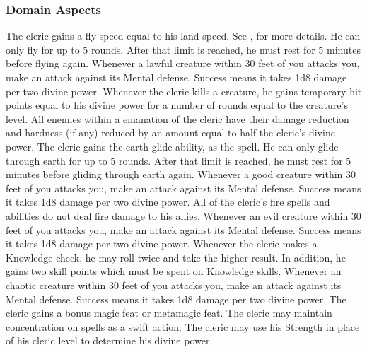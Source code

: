 \subsubsection{Domain Aspects}\label{Domain Aspects}

The cleric gains a fly speed equal to his land speed.
See , for more details.
He can only fly for up to 5 rounds.
After that limit is reached, he must rest for 5 minutes before flying again.
Whenever a lawful creature within 30 feet of you attacks you, make an attack against its Mental defense.
Success means it takes 1d8 damage per two divine power.
Whenever the cleric kills a creature, he gains temporary hit points equal to his divine power for a number of rounds equal to the creature's level.
All enemies within a \areamed emanation of the cleric have their damage reduction and hardness (if any) reduced by an amount equal to half the cleric's divine power.
The cleric gains the earth glide ability, as the  spell.
He can only glide through earth for up to 5 rounds.
After that limit is reached, he must rest for 5 minutes before gliding through earth again.
Whenever a good creature within 30 feet of you attacks you, make an attack against its Mental defense.
Success means it takes 1d8 damage per two divine power.
All of the cleric's fire spells and abilities do not deal fire damage to his allies.
Whenever an evil creature within 30 feet of you attacks you, make an attack against its Mental defense.
Success means it takes 1d8 damage per two divine power.
Whenever the cleric makes a Knowledge check, he may roll twice and take the higher result.
In addition, he gains two skill points which must be spent on Knowledge skills.
Whenever an chaotic creature within 30 feet of you attacks you, make an attack against its Mental defense.
Success means it takes 1d8 damage per two divine power.
The cleric gains a bonus magic feat or metamagic feat.
The cleric may maintain concentration on  spells as a swift action.
The cleric may use his Strength in place of his cleric level to determine his divine power.

